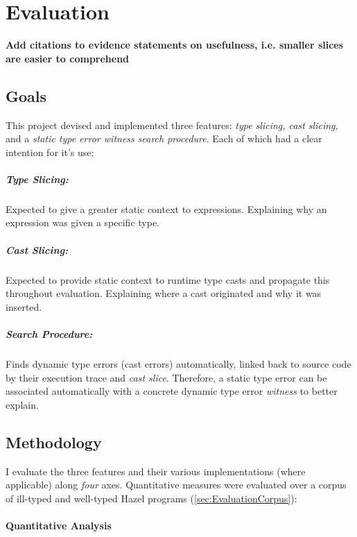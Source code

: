 \chapter{Evaluation}\label{chap:Evaluation}
\textbf{Add citations to evidence statements on usefulness, i.e. smaller slices are easier to comprehend}


\section{Goals}\label{sec:EvaluationGoals}
This project devised and implemented three features: \textit{type slicing, cast slicing,} and a \textit{static type error witness search procedure}. Each of which had a clear intention for it's use:

\paragraph{Type Slicing:} Expected to give a greater static context to expressions. Explaining why an expression was given a specific type.

\paragraph{Cast Slicing:} Expected to provide static context to runtime type casts and propagate this throughout evaluation. Explaining where a cast originated and why it was inserted.

\paragraph{Search Procedure:} Finds dynamic type errors (cast errors) automatically, linked back to source code by their execution trace and \textit{cast slice}. Therefore, a static type error can be associated automatically with a concrete dynamic type error \textit{witness} to better explain.

\section{Methodology}\label{sec:EvaluationMethodology}
I evaluate the three features and their various implementations (where applicable) along \textit{four} axes. Quantitative measures were evaluated over a corpus of ill-typed and well-typed Hazel programs (\cref{sec:EvaluationCorpus}):

\subsubsection{Quantitative Analysis}
